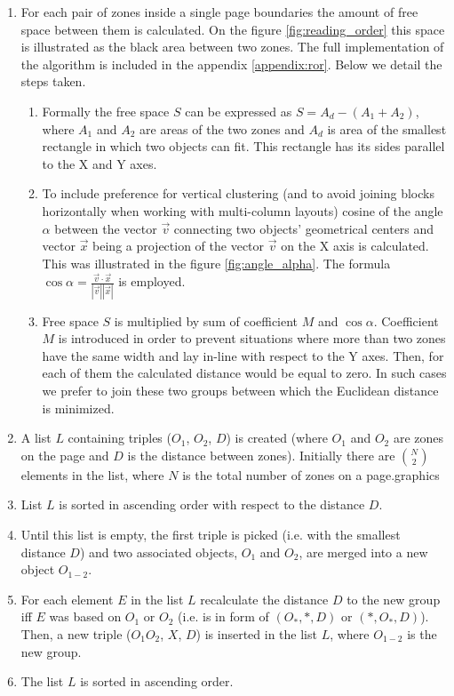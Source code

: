 \begin{enumerate}
\item For each pair of zones inside a single page boundaries the amount of free space between them is calculated. On the figure \ref{fig:reading_order} this space is illustrated as the black area between two zones. The full implementation of the algorithm is included in the appendix \ref{appendix:ror}. Below we detail the steps taken.
	\begin{enumerate} 
	\item Formally the free space $S$ can be expressed as $S = A_d - (A_1+A_2)$, where $A_1$ and $A_2$ are areas of the two zones and $A_d$ is area of the smallest rectangle in which two objects can fit. This rectangle has its sides parallel to the X and Y axes.
	\item To include preference for vertical clustering (and to avoid joining blocks horizontally when working with multi-column layouts) cosine of the angle $\alpha$ between the vector $\vec{v}$ connecting two objects' geometrical centers and vector $\vec{x}$ being a projection of the vector $\vec{v}$ on the X axis is calculated. This was illustrated in the figure \ref{fig:angle_alpha}. The formula $\cos\alpha = \frac{\vec{v} \cdot \vec{x}}{|\vec{v}||\vec{x}|}$ is employed.
	\item Free space $S$ is multiplied by sum of coefficient $M$ and $\cos\alpha$. Coefficient $M$ is introduced in order to prevent situations where more than two zones have the same width and lay in-line with respect to the Y axes. Then, for each of them the calculated distance would be equal to zero. In such cases we prefer to join these two groups between which the Euclidean distance is minimized.
	\end{enumerate}
\item A list $L$ containing triples ($O_1$, $O_2$, $D$) is created (where $O_1$ and $O_2$ are zones on the page and $D$ is the distance between zones). Initially there are $\binom{N}{2}$ elements in the list, where $N$ is the total number of zones on a page.graphics
\item List $L$ is sorted in ascending order with respect to the distance $D$. 
\item Until this list is empty, the first triple is picked (i.e. with the smallest distance $D$) and two associated objects, $O_1$ and $O_2$, are merged into a new object $O_{1-2}$.
\item For each element $E$ in the list $L$ recalculate the distance $D$ to the new group iff $E$ was based on $O_1$ or $O_2$ (i.e. is in form of $(O_*, *, D)$ or $(*, O_*, D)$). Then, a new triple ($O_1O_2$, $X$, $D$) is inserted in the list $L$, where $O_{1-2}$ is the new group.
\item The list $L$ is sorted in ascending order.
\end{enumerate}
